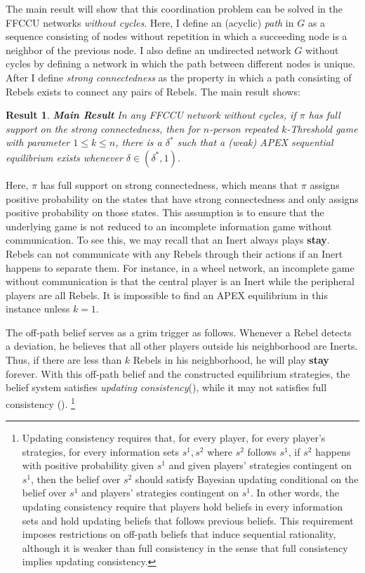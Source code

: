 \documentclass[12pt,letterpaper]{article}
\newtheorem{result}{Result}
\theoremstyle{definition}
\theoremstyle{remark}
\theoremstyle{claim}
\begin{document}
The main result will show that this coordination problem can be solved in the FFCCU networks \textit{without cycles}. Here, I define an (acyclic) \textit{path} in $G$ as a sequence consisting of nodes without repetition in which a succeeding node is a neighbor of the previous node. I also define an undirected network $G$ without cycles by defining a network in which the path between different nodes is unique. After I define \textit{strong connectedness} as the property in which a path consisting of Rebels exists to connect any pairs of Rebels. The main result shows:



\begin{result}\textbf{Main Result}
In any FFCCU network without cycles, if $\pi$ has full support on the strong connectedness, then for $n$-person repeated $k$-Threshold game with parameter $1\leq k \leq n$, there is a $\delta^{*}$ such that a (weak) APEX sequential equilibrium exists whenever $\delta\in (\delta^{*},1)$.  
\end{result}

Here, $\pi$ has full support on strong connectedness, which means that $\pi$ assigns positive probability on the states that have strong connectedness and only assigns positive probability on those states. This assumption is to ensure that the underlying game is not reduced to an incomplete information game without communication. To see this, we may recall that an Inert always plays \textbf{stay}. Rebels can not communicate with any Rebels through their actions if an Inert happens to separate them. For instance, in a wheel network, an incomplete game without communication is that the central player is an Inert while the peripheral players are all Rebels. It is impossible to find an APEX equilibrium in this instance unless $k=1$.



The off-path belief serves as a grim trigger as follows. Whenever a Rebel detects a deviation, he believes that all other players outside his neighborhood are Inerts. Thus, if there are less than $k$ Rebels in his neighborhood, he will play \textbf{stay} forever. With this off-path belief and the constructed equilibrium strategies, the belief system satisfies \textit{updating consistency}(\citep{Perea2002}), while it may not satisfies full consistency (\citep{Krep_Wilson1982}). \footnote{ Updating consistency requires that, for every player, for every player's strategies, for every information sets $s^1,s^2$ where $s^2$ follows $s^1$, if $s^2$ happens with positive probability given $s^1$ and given players' strategies contingent on $s^1$, then the belief over $s^2$ should satisfy Bayesian updating conditional on the belief over $s^1$ and players' strategies contingent on $s^1$. In other words, the updating consistency require that players hold beliefs in every information sets and hold updating beliefs that follows previous beliefs. This requirement imposes restrictions on off-path beliefs that induce sequential rationality, although it is weaker than full consistency in the sense that full consistency implies updating consistency.}
\end{document}

